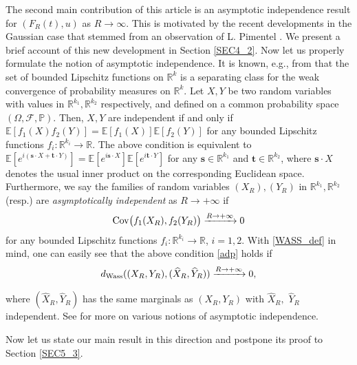 \documentclass[letterpaper, 11pt,  reqno]{amsart}
\newcommand{\wh}{\widehat}
\newcommand{\noi}{\noindent}
\newcommand{\R}{\mathbb{R}}
\newcommand{\E}{\mathbb{E}}
\newcommand{\F}{\mathcal{F}}
\renewcommand{\O}{\Omega}
\newcommand{\PP}{\mathbb{P}}
\numberwithin{equation}{section}
\numberwithin{theorem}{section}
\begin{document}
The second main contribution of this article
is an  asymptotic independence result for $(F_R(t), u )$
 as $R \to \infty$. This is motivated by  the recent developments   \cite{tudor23,TZ23} 
 in  the Gaussian case that stemmed from  an observation of L. Pimentel \cite{pimentel}.
 We present a brief account of this new development in Section \ref{SEC4_2}.
Now let us properly formulate the notion of asymptotic independence.
It is known, e.g., from \cite[Section 11.3]{Dudley}
that the set of bounded Lipschitz functions on $\R^k$
is a separating class for the weak convergence of probability
measures on $\R^k$.
Let $X, Y$ be two random variables with values in  
$\R^{k_1}, \R^{k_2}$ respectively,
and defined on a common probability space $(\O, \F, \PP)$.
Then, $X, Y$ are independent if and only if 
$\E[ f_1(X) f_2(Y) ]  = \E[ f_1(X) ] \E[f_2(Y)]$ for any bounded Lipschitz
functions $f_i: \R^{k_i} \to\R$.
The above condition is equivalent to
$\E[ e^{i  (\pmb{s} \cdot X +   \pmb{t} \cdot Y)}  ]  
=\E[ e^{i  \pmb{s} \cdot X }   ] 
\E[ e^{i     \pmb{t} \cdot Y}  ]   $
for any $\pmb{s}\in\R^{k_1}$ and $\pmb{t}\in\R^{k_2}$,
where $\pmb{s}\cdot X$ denotes the usual inner product
on the corresponding Euclidean space.
Furthermore, we say the families of random variables $(X_R), (Y_R)$
in $\R^{k_1}, \R^{k_2}$ (resp.) are {\it asymptotically independent} 
as $R\to+\infty$ if 
\begin{align} \label{adp}
{\rm Cov} \big( f_1(X_R),  f_2(Y_R) \big)   \xrightarrow{R\to+\infty} 0
\end{align}
for any bounded Lipschitz functions $f_i: \R^{k_i}   \to\R$, $i=1,2$.
With \eqref{WASS_def} in mind, one can easily see that 
the above condition
\eqref{adp} holds if 
\begin{align}\label{XYhat}
d_{\rm Wass}(  (X_R, Y_R), (\wh X_R, \wh Y_R)  ) \xrightarrow{R\to+\infty} 0,
\end{align}


\noi
where $(\wh X_R, \wh Y_R)$ has the same marginals as $ (X_R, Y_R)$
with   $\wh X_R,$ $\wh Y_R$   independent. 
See 
  \cite{DN21} for more on various notions of asymptotic independence.
  
  

 


 Now let us state our main result in this direction
 and postpone its proof to  Section \ref{SEC5_3}.
 
\end{document}
